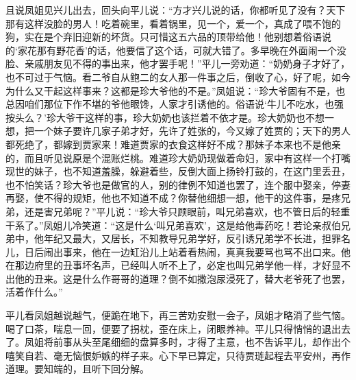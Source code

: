 \begin{parag}


    且说凤姐见兴儿出去，回头向平儿说：“方才兴儿说的话，你都听见了没有？天下那有这样没脸的男人！吃着碗里，看着锅里，见一个，爱一个，真成了喂不饱的狗，实在是个弃旧迎新的坏货。只可惜这五六品的顶带给他！他别想着俗语说的‘家花那有野花香’的话，他要信了这个话，可就大错了。多早晚在外面闹一个没脸、亲戚朋友见不得的事出来，他才罢手呢！”平儿一旁劝道：“奶奶身子才好了，也不可过于气恼。看二爷自从鲍二的女人那一件事之后，倒收了心，好了呢，如今为什么又干起这样事来？这都是珍大爷他的不是。”凤姐说：“珍大爷固有不是，也总因咱们那位下作不堪的爷他眼馋，人家才引诱他的。俗语说‘牛儿不吃水，也强按头么？’珍大爷干这样的事，珍大奶奶也该拦着不依才是。珍大奶奶也不想一想，把一个妹子要许几家子弟才好，先许了姓张的，今又嫁了姓贾的；天下的男人都死绝了，都嫁到贾家来！难道贾家的衣食这样好不成？那妹子本来也不是他亲的，而且听见说原是个混账烂桃。难道珍大奶奶现做着命妇，家中有这样一个打嘴现世的妹子，也不知道羞臊，躲避着些，反倒大面上扬铃打鼓的，在这门里丢丑，也不怕笑话？珍大爷也是做官的人，别的律例不知道也罢了，连个服中娶亲，停妻再娶，使不得的规矩，他也不知道不成？你替他细想一想，他干的这件事，是疼兄弟，还是害兄弟呢？”平儿说：“珍大爷只顾眼前，叫兄弟喜欢，也不管日后的轻重干系了。”凤姐儿冷笑道：“这是什么‘叫兄弟喜欢’，这是给他毒药吃！若论亲叔伯兄弟中，他年纪又最大，又居长，不知教导兄弟学好，反引诱兄弟学不长进，担罪名儿，日后闹出事来，他在一边缸沿儿上站着看热闹，真真我要骂也骂不出口来。他在那边府里的丑事坏名声，已经叫人听不上了，必定也叫兄弟学他一样，才好显不出他的丑来。这是什么作哥哥的道理？倒不如撒泡尿浸死了，替大老爷死了也罢，活着作什么。”
\end{parag}


\begin{parag}

    平儿看凤姐越说越气，便跪在地下，再三苦劝安慰一会子，凤姐才略消了些气恼。喝了口茶，喘息一回，便要了拐枕，歪在床上，闭眼养神。平儿只得悄悄的退出去了。凤姐将前事从头至尾细细的盘算多时，才得了主意，也不吿诉平儿，却作出个嘻笑自若、毫无恼恨妒嫉的样子来。心下早已算定，只待贾琏起程去平安州，再作道理。要知端的，且听下回分解。
\end{parag}

